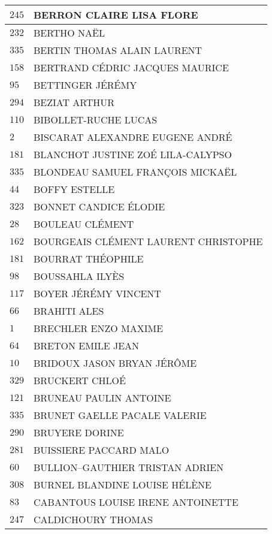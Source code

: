 \begin{xltabular}{\linewidth}{|l|X|}
    \hline
    $245$ & BERRON CLAIRE LISA FLORE \\
    \hline
    $232$ & BERTHO NAËL \\
    \hline
    $335$ & BERTIN THOMAS ALAIN LAURENT \\
    \hline
    $158$ & BERTRAND CÉDRIC JACQUES MAURICE \\
    \hline
    $95$ & BETTINGER JÉRÉMY \\
    \hline
    $294$ & BEZIAT ARTHUR \\
    \hline
    $110$ & BIBOLLET-RUCHE LUCAS \\
    \hline
    $2$ & BISCARAT ALEXANDRE EUGENE ANDRÉ \\
    \hline
    $181$ & BLANCHOT JUSTINE ZOÉ LILA-CALYPSO \\
    \hline
    $335$ & BLONDEAU SAMUEL FRANÇOIS MICKAËL \\
    \hline
    $44$ & BOFFY ESTELLE \\
    \hline
    $323$ & BONNET CANDICE ÉLODIE \\
    \hline
    $28$ & BOULEAU CLÉMENT \\
    \hline
    $162$ & BOURGEAIS CLÉMENT LAURENT CHRISTOPHE \\
    \hline
    $181$ & BOURRAT THÉOPHILE \\
    \hline
    $98$ & BOUSSAHLA ILYÈS \\
    \hline
    $117$ & BOYER JÉRÉMY VINCENT \\
    \hline
    $66$ & BRAHITI ALES \\
    \hline
    $1$ & BRECHLER ENZO MAXIME \\
    \hline
    $64$ & BRETON EMILE JEAN \\
    \hline
    $10$ & BRIDOUX JASON BRYAN JÉRÔME \\
    \hline
    $329$ & BRUCKERT CHLOÉ \\
    \hline
    $121$ & BRUNEAU PAULIN ANTOINE \\
    \hline
    $335$ & BRUNET GAELLE PACALE VALERIE \\
    \hline
    $290$ & BRUYERE DORINE \\
    \hline
    $281$ & BUISSIERE PACCARD MALO \\
    \hline
    $60$ & BULLION--GAUTHIER TRISTAN ADRIEN \\
    \hline
    $308$ & BURNEL BLANDINE LOUISE HÉLÈNE \\
    \hline
    $83$ & CABANTOUS LOUISE IRENE ANTOINETTE \\
    \hline
    $247$ & CALDICHOURY THOMAS \\

\end{xltabular}
